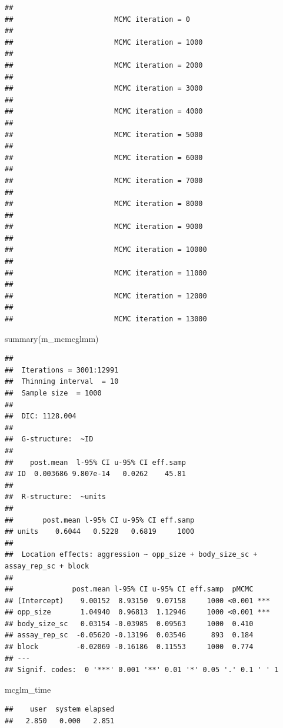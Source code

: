 \documentclass[
  12pt,
]{book}
\newenvironment{Shaded}{\begin{snugshade}}{\end{snugshade}}
\newcommand{\FunctionTok}[1]{\textcolor[rgb]{0.00,0.00,0.00}{#1}}
\newcommand{\NormalTok}[1]{#1}
\begin{document}
\begin{verbatim}
## 
##                        MCMC iteration = 0
## 
##                        MCMC iteration = 1000
## 
##                        MCMC iteration = 2000
## 
##                        MCMC iteration = 3000
## 
##                        MCMC iteration = 4000
## 
##                        MCMC iteration = 5000
## 
##                        MCMC iteration = 6000
## 
##                        MCMC iteration = 7000
## 
##                        MCMC iteration = 8000
## 
##                        MCMC iteration = 9000
## 
##                        MCMC iteration = 10000
## 
##                        MCMC iteration = 11000
## 
##                        MCMC iteration = 12000
## 
##                        MCMC iteration = 13000
\end{verbatim}

\begin{Shaded}
\begin{Highlighting}[]
\FunctionTok{summary}\NormalTok{(m\_mcmcglmm)}
\end{Highlighting}
\end{Shaded}

\begin{verbatim}
## 
##  Iterations = 3001:12991
##  Thinning interval  = 10
##  Sample size  = 1000 
## 
##  DIC: 1128.004 
## 
##  G-structure:  ~ID
## 
##    post.mean  l-95% CI u-95% CI eff.samp
## ID  0.003686 9.807e-14   0.0262    45.81
## 
##  R-structure:  ~units
## 
##       post.mean l-95% CI u-95% CI eff.samp
## units    0.6044   0.5228   0.6819     1000
## 
##  Location effects: aggression ~ opp_size + body_size_sc + assay_rep_sc + block 
## 
##              post.mean l-95% CI u-95% CI eff.samp  pMCMC    
## (Intercept)    9.00152  8.93150  9.07158     1000 <0.001 ***
## opp_size       1.04940  0.96813  1.12946     1000 <0.001 ***
## body_size_sc   0.03154 -0.03985  0.09563     1000  0.410    
## assay_rep_sc  -0.05620 -0.13196  0.03546      893  0.184    
## block         -0.02069 -0.16186  0.11553     1000  0.774    
## ---
## Signif. codes:  0 '***' 0.001 '**' 0.01 '*' 0.05 '.' 0.1 ' ' 1
\end{verbatim}

\begin{Shaded}
\begin{Highlighting}[]
\NormalTok{mcglm\_time}
\end{Highlighting}
\end{Shaded}

\begin{verbatim}
##    user  system elapsed 
##   2.850   0.000   2.851
\end{verbatim}
\end{document}
